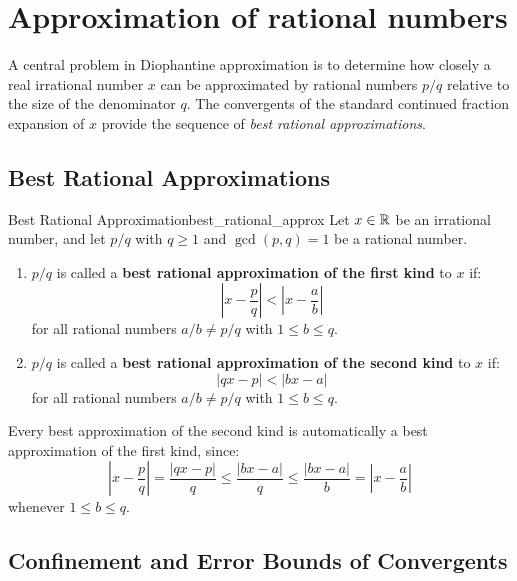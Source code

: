 \documentclass[a4paper]{article}
\begin{document}
\section{Approximation of rational numbers}\label{cf:sec:approximation-of-rational-numbers}
A central problem in Diophantine approximation is to determine how closely a real irrational number $x$ can be approximated by rational numbers $p/q$ relative to the size of the denominator $q$.
The convergents of the standard continued fraction expansion of $x$ provide the sequence of \emph{best rational approximations}.

\subsection{Best Rational Approximations}
\begin{mydefinition}{Best Rational Approximation}{best_rational_approx}
  Let $x \in \mathbb{R}$ be an irrational number, and let $p/q$ with $q \ge 1$ and $\gcd(p, q) = 1$ be a rational number.
  \begin{enumerate}[label=(\roman*)]
    \item $p/q$ is called a \textbf{best rational approximation of the first kind} to $x$ if:
      \[
        \left| x - \frac{p}{q} \right| < \left| x - \frac{a}{b} \right|
      \]
      for all rational numbers $a/b \ne p/q$ with $1 \le b \le q$.
    \item $p/q$ is called a \textbf{best rational approximation of the second kind} to $x$ if:
      \[
        |q x - p| < |b x - a|
      \]
      for all rational numbers $a/b \ne p/q$ with $1 \le b \le q$.
  \end{enumerate}
\end{mydefinition}

\begin{remark}
  Every best approximation of the second kind is automatically a best approximation of the first kind, since:
  \[
    \left| x - \frac{p}{q} \right| = \frac{|q x - p|}{q} \le \frac{|b x - a|}{q} \le \frac{|b x - a|}{b} = \left| x - \frac{a}{b} \right|
  \]
  whenever $1 \le b \le q$.
\end{remark}

\subsection{Confinement and Error Bounds of Convergents}
\end{document}
